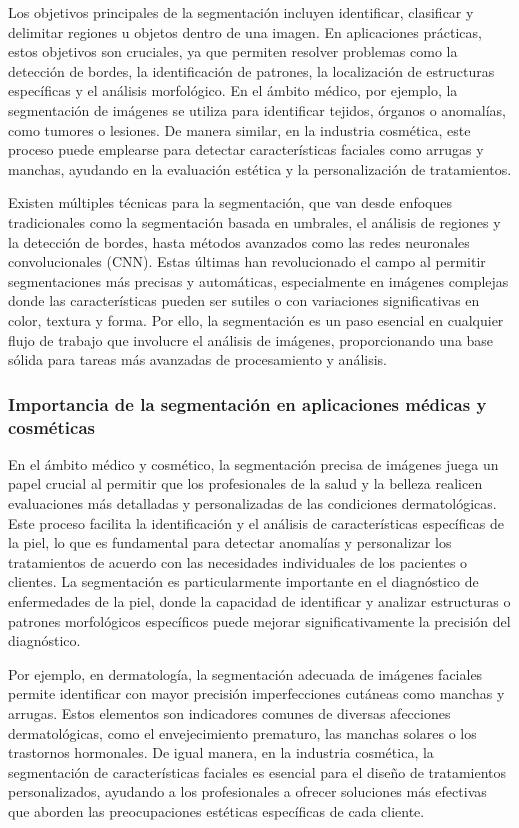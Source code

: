 Los objetivos principales de la segmentación incluyen identificar, clasificar y delimitar regiones u objetos dentro de una imagen. En aplicaciones prácticas, estos objetivos son cruciales, ya que permiten resolver problemas como la detección de bordes, la identificación de patrones, la localización de estructuras específicas y el análisis morfológico. En el ámbito médico, por ejemplo, la segmentación de imágenes se utiliza para identificar tejidos, órganos o anomalías, como tumores o lesiones. De manera similar, en la industria cosmética, este proceso puede emplearse para detectar características faciales como arrugas y manchas, ayudando en la evaluación estética y la personalización de tratamientos. \parencite{gonzalez2018}

Existen múltiples técnicas para la segmentación, que van desde enfoques tradicionales como la segmentación basada en umbrales, el análisis de regiones y la detección de bordes, hasta métodos avanzados como las redes neuronales convolucionales (CNN). Estas últimas han revolucionado el campo al permitir segmentaciones más precisas y automáticas, especialmente en imágenes complejas donde las características pueden ser sutiles o con variaciones significativas en color, textura y forma. Por ello, la segmentación es un paso esencial en cualquier flujo de trabajo que involucre el análisis de imágenes, proporcionando una base sólida para tareas más avanzadas de procesamiento y análisis. \parencite{gonzalez2018}
\subsubsection{Importancia de la segmentación en aplicaciones médicas y cosméticas}
En el ámbito médico y cosmético, la segmentación precisa de imágenes juega un papel crucial al permitir que los profesionales de la salud y la belleza realicen evaluaciones más detalladas y personalizadas de las condiciones dermatológicas. Este proceso facilita la identificación y el análisis de características específicas de la piel, lo que es fundamental para detectar anomalías y personalizar los tratamientos de acuerdo con las necesidades individuales de los pacientes o clientes. La segmentación es particularmente importante en el diagnóstico de enfermedades de la piel, donde la capacidad de identificar y analizar estructuras o patrones morfológicos específicos puede mejorar significativamente la precisión del diagnóstico.

Por ejemplo, en dermatología, la segmentación adecuada de imágenes faciales permite identificar con mayor precisión imperfecciones cutáneas como manchas y arrugas. Estos elementos son indicadores comunes de diversas afecciones dermatológicas, como el envejecimiento prematuro, las manchas solares o los trastornos hormonales. De igual manera, en la industria cosmética, la segmentación de características faciales es esencial para el diseño de tratamientos personalizados, ayudando a los profesionales a ofrecer soluciones más efectivas que aborden las preocupaciones estéticas específicas de cada cliente.

